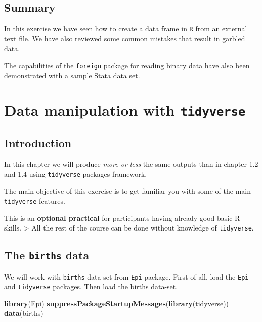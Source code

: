 \documentclass[
]{book}
\newenvironment{Shaded}{\begin{snugshade}}{\end{snugshade}}
\newcommand{\FunctionTok}[1]{\textcolor[rgb]{0.13,0.29,0.53}{\textbf{#1}}}
\newcommand{\NormalTok}[1]{#1}
\begin{document}
\section{Summary}\label{summary}

In this exercise we have seen how to create a data frame in \texttt{R}
from an external text file. We have also reviewed some common mistakes
that result in garbled data.

The capabilities of the \texttt{foreign} package for reading binary
data have also been demonstrated with a sample Stata data set.

\chapter{\texorpdfstring{Data manipulation with \texttt{tidyverse}}{Data manipulation with tidyverse}}\label{data-manipulation-with-tidyverse}

\section{Introduction}\label{introduction-1}

In this chapter we will produce \emph{more or less} the same outputs than in chapter 1.2 and 1.4 using
\texttt{tidyverse} packages framework.

The main objective of this exercise is to get familiar you with some of the main \texttt{tidyverse} features.

This is an \textbf{optional practical} for participants having already good basic R skills.
\textgreater{} All the rest of the course can be done without knowledge of \texttt{tidyverse}.

\section{\texorpdfstring{The \texttt{births} data}{The births data}}\label{the-births-data}

We will work with \texttt{births} data-set from \texttt{Epi} package.
First of all, load the \texttt{Epi} and \texttt{tidyverse} packages.
Then load the births data-set.

\begin{Shaded}
\begin{Highlighting}[]
\FunctionTok{library}\NormalTok{(Epi)}
\FunctionTok{suppressPackageStartupMessages}\NormalTok{(}\FunctionTok{library}\NormalTok{(tidyverse))}
\FunctionTok{data}\NormalTok{(births)}
\end{Highlighting}
\end{Shaded}
\end{document}
